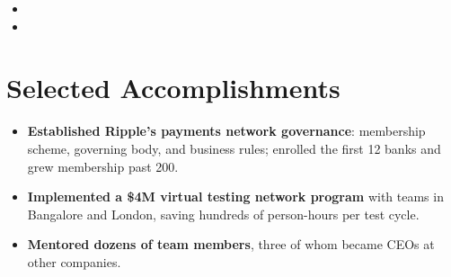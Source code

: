 \documentclass[11pt,letterpaper,sans]{moderncv}
\begin{document}
\begin{itemize}
\vspace{3pt}

\item{}

\vspace{3pt}

\item{}

\end{itemize}


\section{Selected Accomplishments}
\vspace{1pt}
\begin{itemize}
\item {\textbf{Established Ripple's payments network governance}: membership scheme, governing body, and business rules; enrolled the first 12 banks and grew membership past 200.}
\item {\textbf{Implemented a \$4M virtual testing network program} with teams in Bangalore and London, saving hundreds of person-hours per test cycle.}
\item {\textbf{Mentored dozens of team members}, three of whom became CEOs at other companies.}
\end{itemize}

\end{document}
